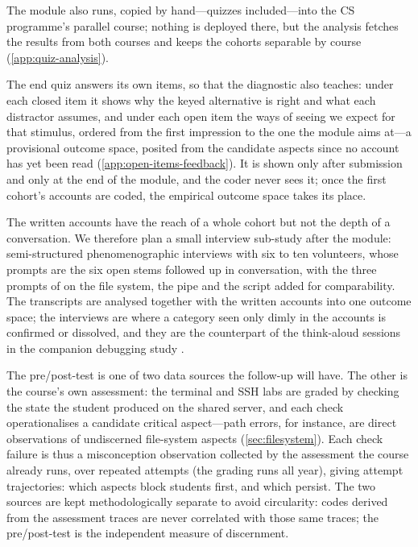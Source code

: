 The module also runs, copied by hand---quizzes included---into the CS
programme's parallel course; nothing is deployed there, but the analysis
fetches the results from both courses and keeps the cohorts separable by
course (\cref{app:quiz-analysis}).

The end quiz answers its own items, so that the diagnostic also teaches:
under each closed item it shows why the keyed alternative is right and
what each distractor assumes, and under each open item the ways of seeing
we expect for that stimulus, ordered from the first impression to the one
the module aims at---a provisional outcome space, posited from the
candidate aspects since no account has yet been read
(\cref{app:open-items-feedback}).
It is shown only after submission and only at the end of the module, and
the coder never sees it; once the first cohort's accounts are coded, the
empirical outcome space takes its place.

The written accounts have the reach of a whole cohort but not the depth
of a conversation.
We therefore plan a small interview sub-study after the module:
semi-structured phenomenographic interviews with six to ten volunteers,
whose prompts are the six open stems followed up in conversation, with
the three prompts of \citeauthor{DoyleLister2006Unix} on the file
system, the pipe and the script added for comparability.
The transcripts are analysed together with the written accounts into one
outcome space; the interviews are where a category seen only dimly in the
accounts is confirmed or dissolved, and they are the counterpart of the
think-aloud sessions in the companion debugging study \autocite{VTDebug}.

The pre/post-test is one of two data sources the follow-up will have.
The other is the course's own assessment: the terminal and SSH labs are
graded by checking the state the student produced on the shared server,
and each check operationalises a candidate critical aspect---path
errors, for instance, are direct observations of undiscerned
file-system aspects (\cref{sec:filesystem}).
Each check failure is thus a misconception observation collected by the
assessment the course already runs, over repeated attempts (the grading
runs all year), giving attempt trajectories: which aspects block
students first, and which persist.
The two sources are kept methodologically separate to avoid
circularity: codes derived from the assessment traces are never
correlated with those same traces; the pre/post-test is the independent
measure of discernment.

